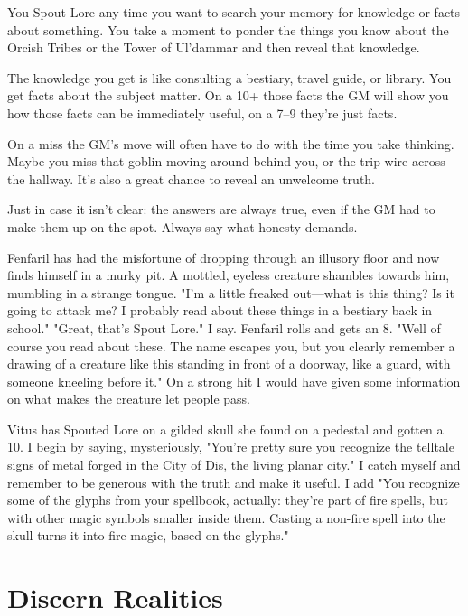 You Spout Lore any time you want to search your memory for knowledge or facts about something. You take a moment to ponder the things you know about the Orcish Tribes or the Tower of Ul'dammar and then reveal that knowledge.

       

The knowledge you get is like consulting a bestiary, travel guide, or library. You get facts about the subject matter. On a 10+ those facts the GM will show you how those facts can be immediately useful, on a 7–9 they're just facts.

       

On a miss the GM's move will often have to do with the time you take thinking. Maybe you miss that goblin moving around behind you, or the trip wire across the hallway. It's also a great chance to reveal an unwelcome truth.

       

Just in case it isn't clear: the answers are always true, even if the GM had to make them up on the spot. Always say what honesty demands.

       
\startExample
Fenfaril has had the misfortune of dropping through an illusory floor and now finds himself in a murky pit. A mottled, eyeless creature shambles towards him, mumbling in a strange tongue. "I'm a little freaked out—what is this thing? Is it going to attack me? I probably read about these things in a bestiary back in school." "Great, that's Spout Lore." I say. Fenfaril rolls and gets an 8. "Well of course you read about these. The name escapes you, but you clearly remember a drawing of a creature like this standing in front of a doorway, like a guard, with someone kneeling before it." On a strong hit I would have given some information on what makes the creature let people pass.
\stopExample
       
\startExample
Vitus has Spouted Lore on a gilded skull she found on a pedestal and gotten a 10. I begin by saying, mysteriously, "You're pretty sure you recognize the telltale signs of metal forged in the City of Dis, the living planar city." I catch myself and remember to be generous with the truth and make it useful. I add "You recognize some of the glyphs from your spellbook, actually: they're part of fire spells, but with other magic symbols smaller inside them. Casting a non-fire spell into the skull turns it into fire magic, based on the glyphs."
\stopExample
       
\section{Discern Realities}    
       

